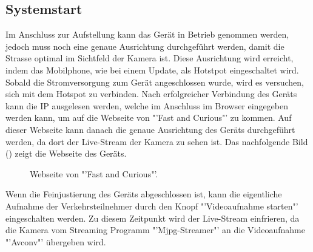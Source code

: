 \subsection{Systemstart}
Im Anschluss zur Aufstellung kann das Gerät in Betrieb genommen werden, jedoch muss noch eine genaue Ausrichtung durchgeführt werden, damit die Strasse optimal im Sichtfeld der Kamera ist. Diese Ausrichtung wird erreicht, indem das Mobilphone, wie bei einem Update, als Hotstpot eingeschaltet wird. Sobald die Stromversorgung zum Gerät angeschlossen wurde, wird es versuchen, sich mit dem Hotspot zu verbinden. Nach erfolgreicher Verbindung des Geräts kann die IP ausgelesen werden, welche im Anschluss im Browser eingegeben werden kann, um auf die Webseite von "'Fast and Curious"' zu kommen. Auf dieser Webseite kann danach die genaue Ausrichtung des Geräts durchgeführt werden, da dort der Live-Stream der Kamera zu sehen ist. Das nachfolgende Bild () zeigt die Webseite des Geräts.

\begin{figure}[H]
  \centering
  \caption{Webseite von "'Fast and Curious"'.}
  \label{bWebsite}
\end{figure} 

Wenn die Feinjustierung des Geräts abgeschlossen ist, kann die eigentliche Aufnahme der Verkehrsteilnehmer durch den Knopf "'Videoaufnahme starten"' eingeschalten werden. Zu diesem Zeitpunkt wird der Live-Stream einfrieren, da die Kamera vom Streaming Programm "'Mjpg-Streamer"' an die Videoaufnahme "'Avconv"' übergeben wird.
